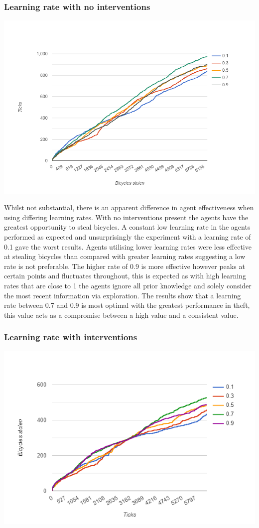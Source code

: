 \documentclass[11pt]{informatics-report}
\begin{document}
\subsubsection{Learning rate with no interventions}
\includegraphics[width = 1\textwidth]{learning.png}

Whilst not substantial, there is an apparent difference in agent effectiveness when using differing learning rates. With no interventions present the agents have the greatest opportunity to steal bicycles. A constant low learning rate in the agents performed as expected and unsurprisingly the experiment with a learning rate of 0.1 gave the worst results. Agents utilising lower learning rates were less effective at stealing bicycles than compared with greater learning rates suggesting a low rate is not preferable. The higher rate of 0.9 is more effective however peaks at certain points and fluctuates throughout, this is expected as with high learning rates that are close to 1 the agents ignore all prior knowledge and solely consider the most recent information via exploration. The results show that a learning rate between 0.7 and 0.9 is most optimal with the greatest performance in theft, this value acts as a compromise between a high value and a consistent value. 

\subsubsection{Learning rate with interventions}
\includegraphics[width = 1\textwidth]{learningwithintervention.png}
\end{document}
